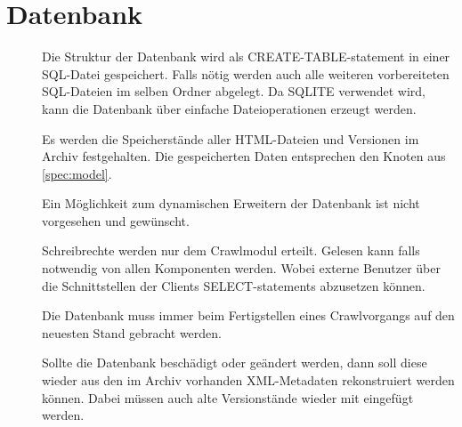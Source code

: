 \section{Datenbank} \label{spec:db}
\begin{description}
	\item []
		Die Struktur der Datenbank wird als CREATE-TABLE-statement in einer SQL-Datei gespeichert.
		Falls nötig werden auch alle weiteren vorbereiteten SQL-Dateien im selben Ordner abgelegt.
		Da SQLITE verwendet wird, kann die Datenbank über einfache Dateioperationen erzeugt werden.
	\item []
		Es werden die Speicherstände aller HTML-Dateien und Versionen im Archiv festgehalten.
        Die gespeicherten Daten entsprechen den Knoten aus \ref{spec:model}.
	\item [] 
		Ein Möglichkeit zum dynamischen Erweitern der Datenbank ist nicht vorgesehen und gewünscht.
	\item []
		Schreibrechte werden nur dem Crawlmodul erteilt.
		Gelesen kann falls notwendig von allen Komponenten werden.
		Wobei externe Benutzer über die Schnittstellen der Clients SELECT-statements abzusetzen können.
	\item []
		Die Datenbank muss immer beim Fertigstellen eines Crawlvorgangs auf den neuesten Stand gebracht werden.
	\item []
		Sollte die Datenbank beschädigt oder geändert werden, dann soll diese wieder aus den
		im Archiv vorhanden XML-Metadaten rekonstruiert werden können.
		Dabei müssen auch alte Versionstände wieder mit eingefügt werden.
\end{description}
